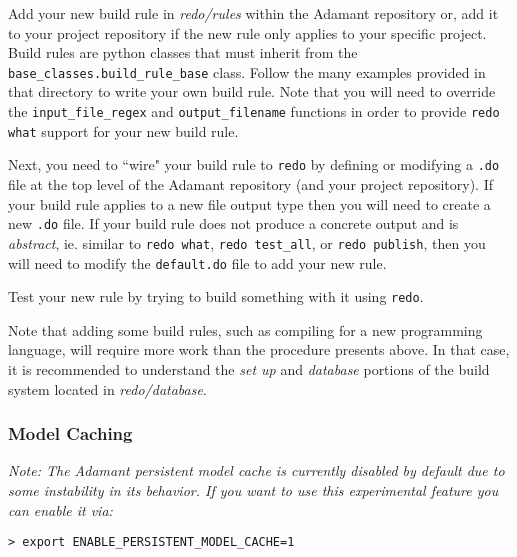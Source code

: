 \vspace{5mm} %
\begin{spacedenumerate}
  \item Add your new build rule in \textit{redo/rules} within the Adamant repository or, add it to your project repository if the new rule only applies to your specific project. Build rules are python classes that must inherit from the \texttt{base\_classes.build\_rule\_base} class. Follow the many examples provided in that directory to write your own build rule. Note that you will need to override the \texttt{input\_file\_regex} and \texttt{output\_filename} functions in order to provide \texttt{redo what} support for your new build rule.
  \item Next, you need to ``wire" your build rule to \texttt{redo} by defining or modifying a \texttt{.do} file at the top level of the Adamant repository (and your project repository). If your build rule applies to a new file output type then you will need to create a new \texttt{.do} file. If your build rule does not produce a concrete output and is \textit{abstract}, ie. similar to \texttt{redo what}, \texttt{redo test\_all}, or \texttt{redo publish}, then you will need to modify the \texttt{default.do} file to add your new rule. 
  \item Test your new rule by trying to build something with it using \texttt{redo}.
\end{spacedenumerate}
\vspace{5mm} %

Note that adding some build rules, such as compiling for a new programming language, will require more work than the procedure presents above. In that case, it is recommended to understand the \textit{set up} and \textit{database} portions of the build system located in \textit{redo/database}.

\subsubsection{Model Caching} \label{The Model Cache}

\textit{Note: The Adamant persistent model cache is currently disabled by default due to some instability in its behavior. If you want to use this experimental feature you can enable it via:}

\vspace{5mm} %
\begin{verbatim}
> export ENABLE_PERSISTENT_MODEL_CACHE=1
\end{verbatim}
\vspace{5mm} %

